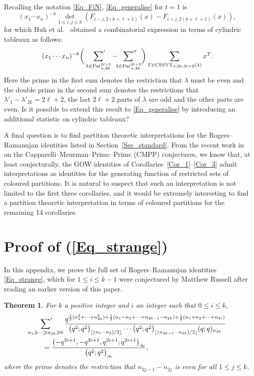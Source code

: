 \documentclass[pdftex]{sigma}
\numberwithin{equation}{section}
\newtheorem{Theorem}{Theorem}[section]
\renewcommand{\leq}{\leqslant}
\renewcommand{\geq}{\geqslant}
\DeclareMathOperator{\Par}{Par}
\DeclareMathOperator{\CSSYT}{CSSYT}
\newcommand{\floor}[1]{\lfloor#1\rfloor}
\newcommand{\la}{\lambda}
\begin{document}
Recalling the notation \eqref{Eq_FiN}, \eqref{Eq_generalise} for $t=1$
is
\[
(x_1\cdots x_n)^{-k} \det_{1\leq i,j\leq k}
 ( F_{i-j,2(k+\ell+1)}(x)-F_{i+j,2(k+\ell+1)}(x) ),
\]
for which Huh et al.\ \cite[Theorem 3.3]{HKKO25} obtained a combinatorial
expression in terms of cylindric tableaux as follows:
\[
(x_1\cdots x_n)^{-k}
\biggl(\:\sideset{}{'}\sum_{\la\in\Par_{n,2k}^{2\ell+2}}
-\sideset{}{''}\sum_{\la\in\Par_{n,2k}^{2\ell+2}}\biggr)
\sum_{T\in\CSSYT_{n;2k,2\ell+2}(\la)} x^T.
\]
Here the prime in the first sum denotes the restriction
that $\la$ must be even and the double prime in the second sum denotes
the restrictions that $\la'_1-\la'_{2k}=2\ell+2$, the last $2\ell+2$
parts of $\la$ are odd and the other parts are even.
Is it possible to extend this result to \eqref{Eq_generalise}
by introducing an additional statistic on cylindric tableaux?

A final question is to find partition theoretic interpretations
for the Rogers--Ramanujan identities listed in Section~\ref{Sec_standard}.
From the recent work in \cite{BKMP24,CMPP22,DK22,KRTW24,Primc24,PT25,Russell23}
on the Capparelli--Meurman--Primc--Primc (CMPP) conjectures, we know that,
at least conjecturally, the GOW identities of
Corollaries~\ref{Cor_1}--\ref{Cor_3} admit interpretations as
identities for the generating function of restricted sets of coloured
partitions.
It is natural to suspect that such an interpretation is not limited to
the first three corollaries, and it would be extremely
interesting to find a partition theoretic interpretation in terms of coloured
partitions for the remaining 14 corollaries.

\appendix

\section{Proof of (\ref{Eq_strange})}

In this appendix, we prove the full set of Rogers--Ramanujan identities \eqref{Eq_strange},
which for $1\leq i\leq k-1$ were conjectured by Matthew Russell after reading an earlier
version of this paper.

\begin{Theorem}\label{Thm_MR}
For $k$ a positive integer and $i$ an integer such that $0\leq i\leq k$,
\begin{align}
&\sideset{}{'}\sum_{n_1\geq\cdots\geq n_{2k}\geq 0}
\frac{q^{\frac{1}{2}(n_1^2+\dots+n_{2k}^2)+
\frac{1}{2}(n_1-n_2+\dots+n_{2k-1}-n_{2k})+
\frac{1}{2}(n_1+n_2+\dots+n_{2i})}}
{\bigl(q^2;q^2\bigr)_{\floor{(n_1-n_2)/2}}\cdots
\bigl(q^2;q^2\bigr)_{\floor{(n_{2k-1}-n_{2k})/2}}
(q;q)_{n_{2k}}} \notag \\
&\qquad{}=\frac{\bigl(-q^{2i+1},-q^{2i+1},q^{2i+1};q^{2i+1}\bigr)_{\infty}}
{\bigl(q^2;q^2\bigr)_{\infty}}, \label{Eq_MR}
\end{align}
where the prime denotes the restriction
that $n_{2j-1}-n_{2j}$ is even for all $1\leq j\leq k$.
\end{Theorem}
\end{document}
